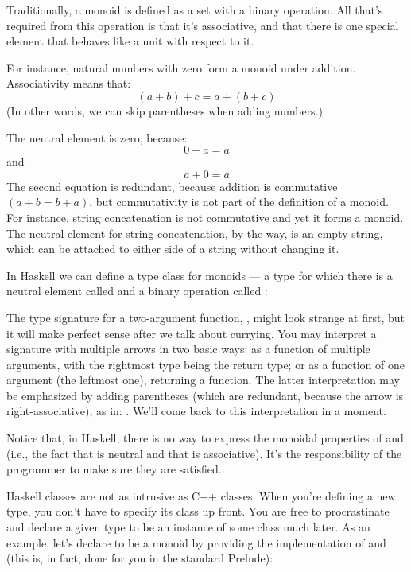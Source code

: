 Traditionally, a monoid is defined as a set with a binary operation. All
that's required from this operation is that it's associative, and that
there is one special element that behaves like a unit with respect to
it.

For instance, natural numbers with zero form a monoid under addition.
Associativity means that:
\[(a + b) + c = a + (b + c)\]
(In other words, we can skip parentheses when adding numbers.)

The neutral element is zero, because:
\[0 + a = a\]
and
\[a + 0 = a\]
The second equation is redundant, because addition is commutative $(a + b
  = b + a)$, but commutativity is not part of the definition of a monoid.
For instance, string concatenation is not commutative and yet it forms a
monoid. The neutral element for string concatenation, by the way, is an
empty string, which can be attached to either side of a string without
changing it.

In Haskell we can define a type class for monoids --- a type for which
there is a neutral element called  and a binary operation
called :

The type signature for a two-argument function,
, might look strange at first,
but it will make perfect sense after we talk about currying. You may
interpret a signature with multiple arrows in two basic ways: as a
function of multiple arguments, with the rightmost type being the return
type; or as a function of one argument (the leftmost one), returning a
function. The latter interpretation may be emphasized by adding
parentheses (which are redundant, because the arrow is
right-associative), as in: .
We'll come back to this interpretation in a moment.

Notice that, in Haskell, there is no way to express the monoidal
properties of  and  (i.e., the fact that
 is neutral and that  is associative).
It's the responsibility of the programmer to make sure they are
satisfied.

Haskell classes are not as intrusive as C++ classes. When you're
defining a new type, you don't have to specify its class up front. You
are free to procrastinate and declare a given type to be an instance of
some class much later. As an example, let's declare  to
be a monoid by providing the implementation of  and
 (this is, in fact, done for you in the standard
Prelude):

